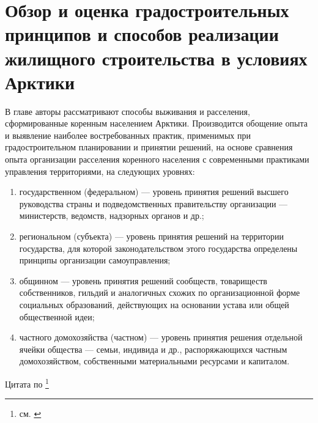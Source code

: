 \chapter{Обзор и оценка градостроительных принципов и способов реализации жилищного строительства в условиях Арктики}
В главе авторы рассматривают способы выживания и расселения, сформированные коренным населением Арктики.
Производится обощение опыта и выявление наиболее востребованных практик, применимых при градостроительном планировании и принятии решений,
на основе сравнения опыта организации расселения коренного населения с современными практиками управления территориями, на следующих уровнях:
\begin{enumerate}[1)]
    \item государственном (федеральном) — уровень принятия решений высшего руководства страны и подведомственных правительству организации — министерств, ведомств, надзорных органов и др.;
    \item региональном (субъекта) — уровень принятия решений на территории государства, для которой законодательством этого государства определены принципы организации самоуправления;
    \item общинном — уровень принятия решений сообществ, товариществ собственников, гильдий и аналогичных схожих по организационной форме
    социальных образований, действующих на основании устава или общей общественной идеи;
    \item частного домохозяйства (частном) — уровень принятия решения отдельной ячейки общества — семьи, индивида и др., распоряжающихся частным
    домохозяйством, собственными материальными ресурсами и капиталом.
\end{enumerate}
Цитата по \footnote{см. \cite{up_Avdotin_GradProektirovanie, law_RU_GradoCodex}}



